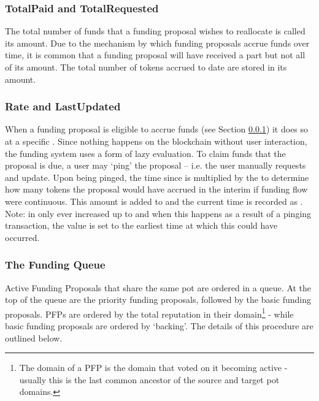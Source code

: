 \subsubsection*{TotalPaid and TotalRequested}
The total number of funds that a funding proposal wishes to reallocate is called its  amount. Due to the mechanism by which funding proposals accrue funds over time, it is common that a funding proposal will have received a part but not all of its  amount. The total number of tokens accrued to date are stored in its  amount. 

\subsubsection*{Rate and LastUpdated}
When a funding proposal is eligible to accrue funds (see Section \ref{subsec:funding-queue}) it does so at a specific . Since nothing happens on the blockchain without user interaction, the funding system uses a form of lazy evaluation. To claim funds that the proposal is due, a user may `ping' the proposal -- i.e. the user manually requests and update. Upon being pinged, the time since  is multiplied by the  to determine how many tokens the proposal would have accrued in the interim if funding flow were continuous. This amount is added to  and the current time is recorded as .\\
Note:  in only ever increased up to  and when this happens as a result of a pinging transaction, the  value is set to the earliest time at which this could have occurred.

\subsubsection{The Funding Queue}\label{subsec:funding-queue}
Active Funding Proposals that share the same  pot are ordered in a queue. At the top of the queue are the priority funding proposals, followed by the basic funding proposals. PFPs are ordered by the total reputation in their domain\footnote{The domain of a PFP is the domain that voted on it becoming active - usually this is the last common ancestor of the source and target pot domains.} - while basic funding proposals are ordered by `backing'.  The details of this procedure are outlined below.\\

